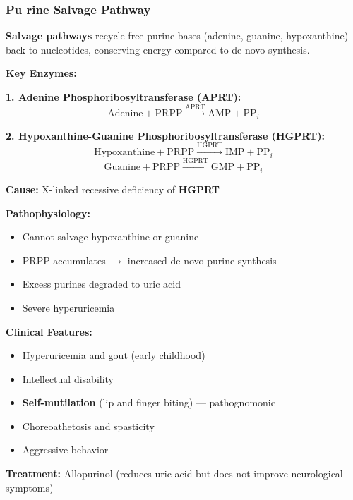 \subsubsection{Pu
rine Salvage Pathway}

\begin{definition}
\textbf{Salvage pathways} recycle free purine bases (adenine, guanine, hypoxanthine) back to nucleotides, conserving energy compared to de novo synthesis.
\end{definition}

\textbf{Key Enzymes:}

\textbf{1. Adenine Phosphoribosyltransferase (APRT):}
\[
\text{Adenine} + \text{PRPP} \xrightarrow{\text{APRT}} \text{AMP} + \text{PP}_i
\]

\textbf{2. Hypoxanthine-Guanine Phosphoribosyltransferase (HGPRT):}
\[
\text{Hypoxanthine} + \text{PRPP} \xrightarrow{\text{HGPRT}} \text{IMP} + \text{PP}_i
\]
\[
\text{Guanine} + \text{PRPP} \xrightarrow{\text{HGPRT}} \text{GMP} + \text{PP}_i
\]

\begin{tcolorbox}[colback=red!5, colframe=red!70!black, title=\textbf{Clinical Correlation: Lesch-Nyhan Syndrome}]
\textbf{Cause:} X-linked recessive deficiency of \textbf{HGPRT}

\textbf{Pathophysiology:}
\begin{itemize}
    \item Cannot salvage hypoxanthine or guanine
    \item PRPP accumulates $\rightarrow$ increased de novo purine synthesis
    \item Excess purines degraded to uric acid
    \item Severe hyperuricemia
\end{itemize}

\textbf{Clinical Features:}
\begin{itemize}
    \item Hyperuricemia and gout (early childhood)
    \item Intellectual disability
    \item \textbf{Self-mutilation} (lip and finger biting) — pathognomonic
    \item Choreoathetosis and spasticity
    \item Aggressive behavior
\end{itemize}

\textbf{Treatment:} Allopurinol (reduces uric acid but does not improve neurological symptoms)
\end{tcolorbox}

